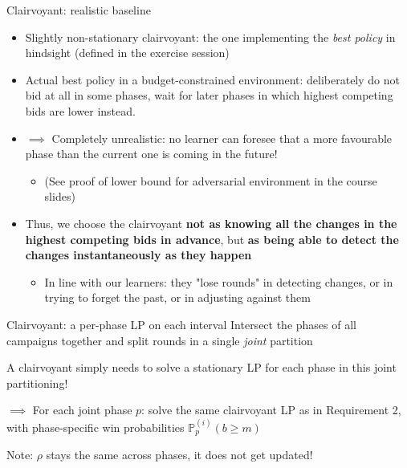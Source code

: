 \begin{frame}{Clairvoyant: realistic baseline}
    \begin{itemize}
        \item Slightly non-stationary clairvoyant: the one implementing the \emph{best policy} in hindsight (defined in the exercise session)
        \item Actual best policy in a budget-constrained environment: deliberately do not bid at all in some phases, wait for later phases in which highest competing bids are lower instead.
        \item $\implies$ Completely unrealistic: no learner can foresee that a more favourable phase than the current one is coming in the future! 
        \begin{itemize}
            \item (See proof of lower bound for adversarial environment in the course slides)
        \end{itemize}
        \item Thus, we choose the clairvoyant \textbf{not as knowing all the changes in the highest competing bids in advance}, but \textbf{as being able to detect the changes instantaneously as they happen}
        \begin{itemize}
            \item In line with our learners: they "lose rounds" in detecting changes, or in trying to forget the past, or in adjusting against them
        \end{itemize}
    \end{itemize}
\end{frame}

\begin{frame}{Clairvoyant: a per-phase LP on each interval}
    Intersect the phases of all campaigns together and split rounds in a single \emph{joint} partition

    \vspace{0.2cm}

    \begin{block}{}
        A clairvoyant simply needs to solve a stationary LP for each phase in this joint partitioning!
        
        $\implies$ For each joint phase $p$: solve the same clairvoyant LP as in Requirement 2, with phase-specific win probabilities $\mathbb{P}^{(i)}_p(b \ge m)$
    \end{block}

    \vspace{0.8cm}

    \begin{alertblock}{Note:}
        $\rho$ stays the same across phases, it does not get updated!
    \end{alertblock}
\end{frame}



